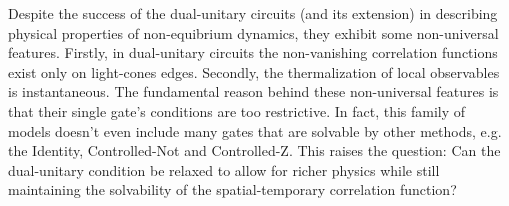 \documentclass[aps,prx,twocolumn,notitlepage,nofootinbib,nobalancelastpage]{revtex4-2}
\theoremstyle{break}
\newcommand{\1}{\mathbbm{1}}
\theoremstyle{plain}
\theoremstyle{plain}
\theoremstyle{plain}
\newcommand{\pk}[1]{{\color{blue}[#1]}}
\begin{document}
Despite the success of the dual-unitary circuits (and its extension) in describing  physical properties of non-equibrium dynamics, they exhibit some non-universal features. 
Firstly, in dual-unitary circuits the non-vanishing correlation functions exist only on light-cones edges. %
Secondly, the thermalization of local observables is instantaneous. The fundamental reason behind these non-universal features is that their single gate's conditions are too restrictive. In fact, this family of models doesn't even include many gates that are solvable by other methods, e.g. the Identity, Controlled-Not and Controlled-Z.
This raises the question: Can the dual-unitary condition be relaxed to allow for richer physics while still maintaining the solvability of the spatial-temporary correlation function? %

\end{document}
